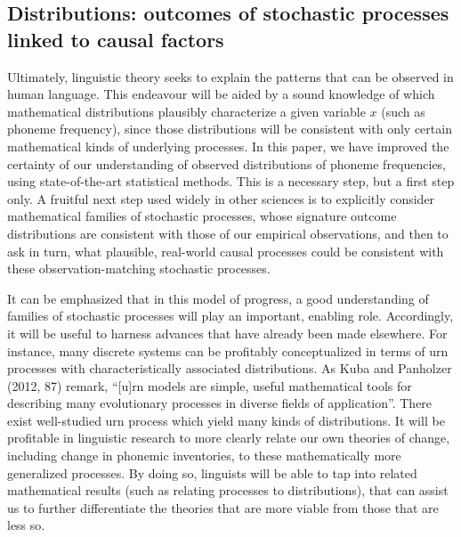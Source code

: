 \hypertarget{distributions-outcomes-of-stochastic-processes-linked-to-causal-factors}{%
\subsection*{Distributions: outcomes of stochastic processes linked to causal factors}\label{distributions-outcomes-of-stochastic-processes-linked-to-causal-factors}}

Ultimately, linguistic theory seeks to explain the patterns that can be observed in human language. This endeavour will be aided by a sound knowledge of which mathematical distributions plausibly characterize a given variable \(x\) (such as phoneme frequency), since those distributions will be consistent with only certain mathematical kinds of underlying processes. In this paper, we have improved the certainty of our understanding of observed distributions of phoneme frequencies, using state-of-the-art statistical methods. This is a necessary step, but a first step only. A fruitful next step used widely in other sciences is to explicitly consider mathematical families of stochastic processes, whose signature outcome distributions are consistent with those of our empirical observations, and then to ask in turn, what plausible, real-world causal processes could be consistent with these observation-matching stochastic processes.

It can be emphasized that in this model of progress, a good understanding of families of stochastic processes will play an important, enabling role. Accordingly, it will be useful to harness advances that have already been made elsewhere. For instance, many discrete systems can be profitably conceptualized in terms of urn processes with characteristically associated distributions. As Kuba and Panholzer (2012, 87) remark, ``{[}u{]}rn models are simple, useful mathematical tools for describing many evolutionary processes in diverse fields of application''. There exist well-studied urn process which yield many kinds of distributions. It will be profitable in linguistic research to more clearly relate our own theories of change, including change in phonemic inventories, to these mathematically more generalized processes. By doing so, linguists will be able to tap into related mathematical results (such as relating processes to distributions), that can assist us to further differentiate the theories that are more viable from those that are less so. \newline

